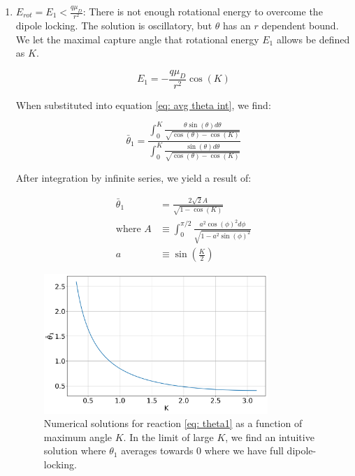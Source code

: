 \begin{enumerate}
	\item $E_{rot} = E_1 < \frac{q \mu_D}{r^2}$:
	There is not enough rotational energy to overcome the dipole locking. The solution is oscillatory, but $\theta$ has an $r$ dependent bound. We let the maximal capture angle that rotational energy $E_1$ allows be defined as $K$.

	\begin{equation*}
		E_1=-\frac{q \mu_D}{r^2}\cos(K)
	\end{equation*}

	When substituted into equation \ref{eq: avg theta int}, we find:

	\begin{equation}
	    \bar{\theta}_1 = \dfrac{\displaystyle\int_0^K \frac{\theta \sin(\theta) d \theta}{\sqrt{\cos(\theta) - \cos(K)}}}{\displaystyle\int_0^K \frac{\sin(\theta) d \theta}{\sqrt{\cos(\theta) - \cos(K)}}} \label{eq: theta1}
	\end{equation}

	After integration by infinite series, we yield a result of:

	\begin{align*}
	    \bar{\theta}_1 & = \frac{2 \sqrt{2}A}{\sqrt{1-\cos(K)}} \\
	    \text{where }A & \equiv \int_0^{\pi/2} \frac{a^2 \cos(\phi)^2 d\phi}{\sqrt{1-a^2 \sin(\phi)^2}} \\
	    a & \equiv \sin\left(\frac{K}{2}\right)
	\end{align*}

	\begin{figure}[H]
		\label{fig: theta1}
		\centering
		\includegraphics[width=0.8\textwidth]{images/ADO_theta1.png}
		\caption{Numerical solutions for reaction \ref{eq: theta1} as a function of maximum angle $K$. In the limit of large $K$, we find an intuitive solution where $\theta_1$ averages towards 0 where we have full dipole-locking.}
	\end{figure}


\end{enumerate}
